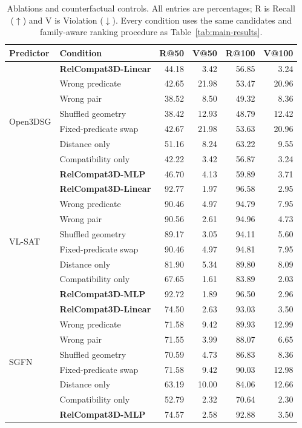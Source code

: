 \begin{table}[t]
\centering
{\small
\setlength{\tabcolsep}{1.5pt}
\begin{tabular}{@{}llrrrr@{}}
\toprule
Predictor & Condition & R@50 & V@50 & R@100 & V@100 \\
\midrule
\multirow{8}{*}{Open3DSG} & \textbf{RelCompat3D-Linear} & 44.18 & 3.42 & 56.85 & 3.24 \\
& Wrong predicate & 42.65 & 21.98 & 53.47 & 20.96 \\
& Wrong pair & 38.52 & 8.50 & 49.32 & 8.36 \\
& Shuffled geometry & 38.42 & 12.93 & 48.79 & 12.42 \\
& Fixed-predicate swap & 42.67 & 21.98 & 53.63 & 20.96 \\
& Distance only & 51.16 & 8.24 & 63.22 & 9.55 \\
& Compatibility only & 42.22 & 3.42 & 56.87 & 3.24 \\
& \textbf{RelCompat3D-MLP} & 46.70 & 4.13 & 59.89 & 3.71 \\
\midrule
\multirow{8}{*}{VL-SAT} & \textbf{RelCompat3D-Linear} & 92.77 & 1.97 & 96.58 & 2.95 \\
& Wrong predicate & 90.46 & 4.97 & 94.79 & 7.95 \\
& Wrong pair & 90.56 & 2.61 & 94.96 & 4.73 \\
& Shuffled geometry & 89.17 & 3.05 & 94.11 & 5.60 \\
& Fixed-predicate swap & 90.46 & 4.97 & 94.81 & 7.95 \\
& Distance only & 81.90 & 5.34 & 89.80 & 8.09 \\
& Compatibility only & 67.65 & 1.61 & 83.89 & 2.03 \\
& \textbf{RelCompat3D-MLP} & 92.72 & 1.89 & 96.50 & 2.96 \\
\midrule
\multirow{8}{*}{SGFN} & \textbf{RelCompat3D-Linear} & 74.50 & 2.63 & 93.03 & 3.50 \\
& Wrong predicate & 71.58 & 9.42 & 89.93 & 12.99 \\
& Wrong pair & 71.55 & 3.99 & 88.07 & 6.65 \\
& Shuffled geometry & 70.59 & 4.73 & 86.83 & 8.36 \\
& Fixed-predicate swap & 71.58 & 9.42 & 90.03 & 12.98 \\
& Distance only & 63.19 & 10.00 & 84.06 & 12.66 \\
& Compatibility only & 52.79 & 2.32 & 70.64 & 2.30 \\
& \textbf{RelCompat3D-MLP} & 74.57 & 2.58 & 92.88 & 3.50 \\
\bottomrule
\end{tabular}
}
\caption{Ablations and counterfactual controls. All entries are percentages;
R is Recall ($\uparrow$) and V is Violation ($\downarrow$). Every condition uses
the same candidates and family-aware ranking procedure as
Table~\ref{tab:main-results}.}
\label{tab:ablations}
\end{table}
